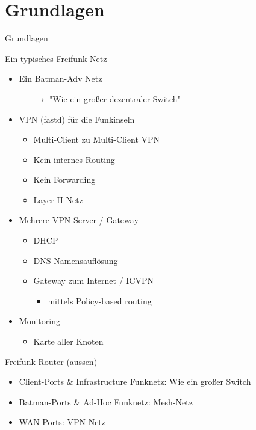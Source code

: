 \section{Grundlagen}
\begin{frame}{}
    \begin{center}
        Grundlagen
     \end{center}
\end{frame}

\begin{frame}{Ein typisches Freifunk Netz}
    \begin{itemize}
        \item Ein Batman-Adv Netz
        \begin{itemize}
            \item[$\rightarrow$] "Wie ein großer dezentraler Switch"
        \end{itemize}
        \item VPN (fastd) für die Funkinseln
        \begin{itemize}
            \item Multi-Client zu Multi-Client VPN
            \item Kein internes Routing
            \item Kein Forwarding
            \item Layer-II Netz
        \end{itemize}
        \item Mehrere VPN Server / Gateway
        \begin{itemize}
            \item DHCP
            \item DNS Namensauflösung
            \item Gateway zum Internet / ICVPN
            \begin{itemize}
                \item \zb{} mittels Policy-based routing
            \end{itemize}
        \end{itemize}
        \item Monitoring
        \begin{itemize}
            \item Karte aller Knoten
        \end{itemize}
    \end{itemize}
\end{frame}

\begin{frame}{Freifunk Router (aussen)}
    \begin{itemize}
        \item Client-Ports \& Infrastructure Funknetz:
            Wie ein großer Switch
        \item Batman-Ports \& Ad-Hoc Funknetz:
            Mesh-Netz
        \item WAN-Ports:
            VPN Netz
    \end{itemize}
\end{frame}

